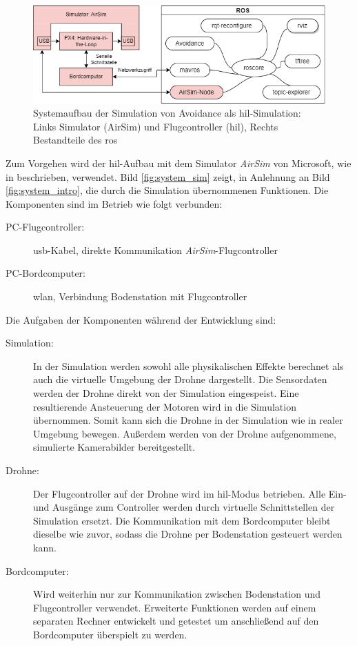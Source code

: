 \begin{figure}[!ht]
    \centering
    \includegraphics[width=\linewidth]{images/simulation_ros-Page-2.drawio.png}
    \caption[Systemaufbau der Simulation von Avoidance als \gls{hil}-Simulation]{Systemaufbau der Simulation von Avoidance als \gls{hil}-Simulation: Links Simulator (AirSim) und Flugcontroller (\gls{hil}), Rechts Bestandteile des \acrshort{ros}}
    \label{fig:system_sim_airsim}
\end{figure}

Zum Vorgehen wird der \gls{hil}-Aufbau mit dem Simulator \textit{AirSim} von Microsoft\cite{microsoftcorporationWelcomeAirSim2023}, wie in \cite[Kapitel 3.4.1]{markusreinErweiterungBestehenderDrohnen2023} beschrieben, verwendet. Bild \ref{fig:system_sim} zeigt, in Anlehnung an Bild \ref{fig:system_intro}, die durch die Simulation übernommenen Funktionen. Die Komponenten sind im Betrieb wie folgt verbunden:
\begin{description}
    \item[PC-Flugcontroller:] \acrshort{usb}-Kabel, direkte Kommunikation \textit{AirSim}-Flugcontroller
    \item[PC-Bordcomputer:] \acrshort{wlan}, Verbindung Bodenstation mit Flugcontroller
\end{description}

Die Aufgaben der Komponenten während der Entwicklung sind:
\begin{description}
    \item[Simulation:] In der Simulation werden sowohl alle physikalischen Effekte berechnet als auch die virtuelle Umgebung der Drohne dargestellt. Die Sensordaten werden der Drohne direkt von der Simulation eingespeist. Eine resultierende Ansteuerung der Motoren wird in die Simulation übernommen. Somit kann sich die Drohne in der Simulation wie in realer Umgebung bewegen. Außerdem werden von der Drohne aufgenommene, simulierte Kamerabilder bereitgestellt.
    \item[Drohne:] Der Flugcontroller auf der Drohne wird im \gls{hil}-Modus betrieben. Alle Ein- und Ausgänge zum Controller werden durch virtuelle Schnittstellen der Simulation ersetzt. Die Kommunikation mit dem Bordcomputer bleibt dieselbe wie zuvor, sodass die Drohne per Bodenstation gesteuert werden kann.
    \item[Bordcomputer:] Wird weiterhin nur zur Kommunikation zwischen Bodenstation und Flugcontroller verwendet. Erweiterte Funktionen werden auf einem separaten Rechner entwickelt und getestet um anschließend auf den Bordcomputer überspielt zu werden.
\end{description}

